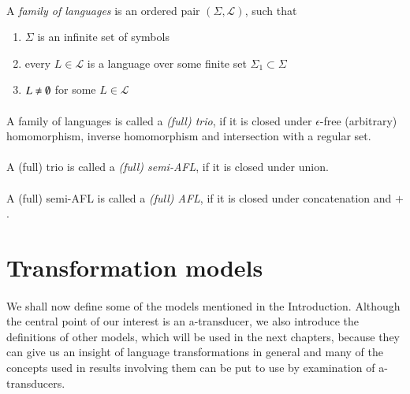 \paragraph{}
 A \emph{family of languages} is an ordered pair $(\Sigma ,\mathcal{L} )$, such that
\begin{enumerate}
\item $\Sigma $ is an infinite set of symbols
\item every $L\in \mathcal{L} $ is a language over some finite set $\Sigma_1 \subset \Sigma $
\item $L \neq \es $ for some $L \in \mathcal{L} $
\end{enumerate}

\paragraph{}
 A family of languages is called a \emph{(full) trio}, if it is closed under $\epsilon $-free (arbitrary) homomorphism, inverse homomorphism and intersection with a regular set.

\paragraph{}
 A (full) trio is called a \emph{(full) semi-AFL}, if it is closed under union.

\paragraph{}
 A (full) semi-AFL is called a \emph{(full) AFL}, if it is closed under concatenation and $+$.

\section{Transformation models}
\paragraph{}
We shall now define some of the models mentioned in the Introduction. Although the central point of our interest is an a-transducer, we also introduce the definitions of other models, which will be used in the next chapters, because they can give us an insight of language transformations in general and many of the concepts used in results involving them can be put to use by examination of a-transducers.

